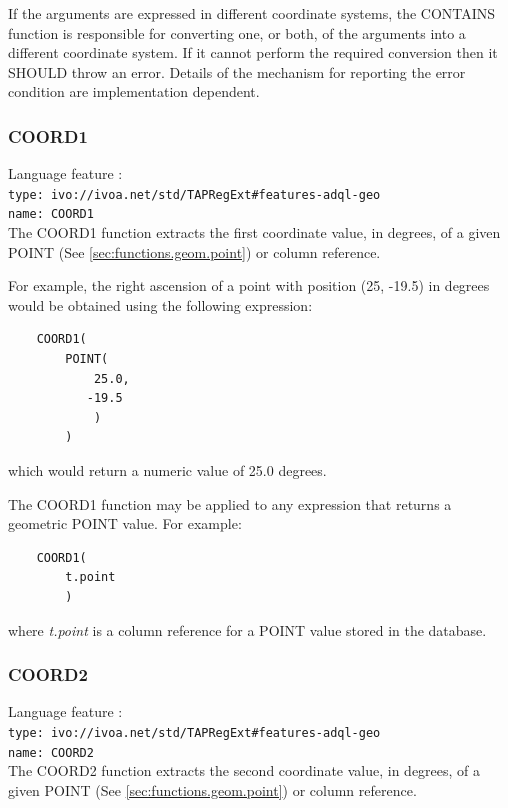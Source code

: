 \documentclass[11pt,a4paper]{ivoa}
\begin{document}
If the arguments are expressed in different coordinate systems, the
CONTAINS function is responsible for converting one, or both, of the
arguments into a different coordinate system.
If it cannot perform the required conversion then it SHOULD throw an
error.
Details of the mechanism for reporting the error condition are
implementation dependent.

\subsubsection{COORD1}
\label{sec:functions.geom.coord1}
{\footnotesize Language feature :}\\
{\footnotesize \verb|type: ivo://ivoa.net/std/TAPRegExt#features-adql-geo|}\\
{\footnotesize \verb|name: COORD1|}\\

The COORD1 function extracts the first coordinate value, in degrees, of a given
POINT (See \ref{sec:functions.geom.point}) or column reference.

For example, the right ascension of a point with position (25, -19.5) in
degrees would be obtained using the following expression:
\begin{verbatim}
    COORD1(
        POINT(
            25.0,
           -19.5
            )
        )
\end{verbatim}
\noindent
which would return a numeric value of 25.0 degrees.

The COORD1 function may be applied to any expression that returns a
geometric POINT value.
For example:
\begin{verbatim}
    COORD1(
        t.point
        )
\end{verbatim}
\noindent
where \textit{t.point} is a column reference for a POINT value
stored in the database.

\subsubsection{COORD2}
\label{sec:functions.geom.coord2}
{\footnotesize Language feature :}\\
{\footnotesize \verb|type: ivo://ivoa.net/std/TAPRegExt#features-adql-geo|}\\
{\footnotesize \verb|name: COORD2|}\\

The COORD2 function extracts the second coordinate value, in degrees, of a given
POINT (See \ref{sec:functions.geom.point}) or column reference.
\end{document}
